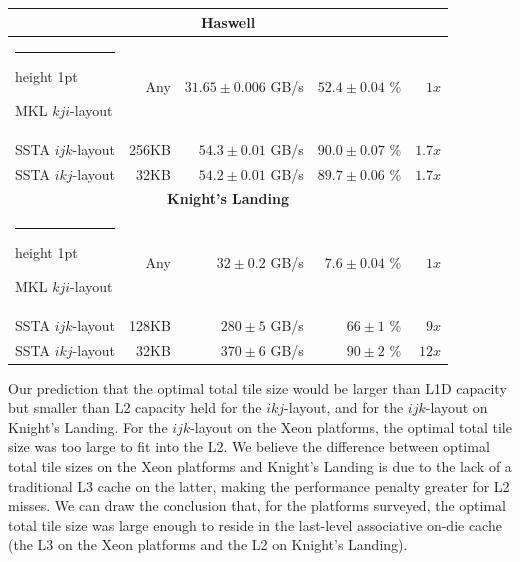 \documentclass{sig-alternate}
\makeatletter
\newcommand{\textapprox}{\texttildelow}
\newcommand{\thickhline}{%
    \noalign {\ifnum 0=`}\fi \hrule height 1pt
    \futurelet \reserved@a \@xhline
}
\makeatother
\begin{document}
\begin{table}[t]
\begin{tabular}{|l|r|r|r|r|}
    \multicolumn{5}{c}{\rule{0pt}{2.25ex} \textbf{Haswell}}           \\ \hline \thickhline
    MKL \(kji\)-layout  &   Any & \(31.65 \pm 0.006\) GB/s & \(52.4 \pm 0.04\) \% & \(1x\)        \\ \hline
    SSTA \(ijk\)-layout & 256KB &   \(54.3 \pm 0.01\) GB/s & \(90.0 \pm 0.07\) \% & \textapprox \(1.7x\) \\ \hline
    SSTA \(ikj\)-layout &  32KB &   \(54.2 \pm 0.01\) GB/s & \(89.7 \pm 0.06\) \% & \textapprox \(1.7x\) \\ \hline

    \multicolumn{5}{c}{\rule{0pt}{2.25ex} \textbf{Knight's Landing}}  \\ \hline \thickhline
    MKL \(kji\)-layout  &   Any & \(32 \pm 0.2\) GB/s &\(7.6 \pm 0.04\) \% & \(1x\)               \\ \hline
    SSTA \(ijk\)-layout & 128KB &  \(280 \pm 5\) GB/s &\(66 \pm 1\) \%     & \textapprox \(9x\)          \\ \hline
    SSTA \(ikj\)-layout &  32KB &  \(370 \pm 6\) GB/s &\(90 \pm 2\) \%     & \textapprox \(12x\)         \\ \hline
  \end{tabular}
\end{table}

Our prediction that the optimal total tile size would be larger than L1D
  capacity but smaller than L2 capacity held for the \(ikj\)-layout, and for 
  the \(ijk\)-layout on Knight's Landing.
For the \(ijk\)-layout on the Xeon platforms, the optimal total tile size was
  too large to fit into the L2.
We believe the difference between optimal total tile sizes on the Xeon
  platforms and Knight's Landing is due to the lack of a traditional L3 cache on
  the latter, making the performance penalty greater for L2 misses.
We can draw the conclusion that, for the platforms surveyed, the optimal total
  tile size was large enough to reside in the last-level associative on-die
  cache (the L3 on the Xeon platforms and the L2 on Knight's Landing).
\end{document}
